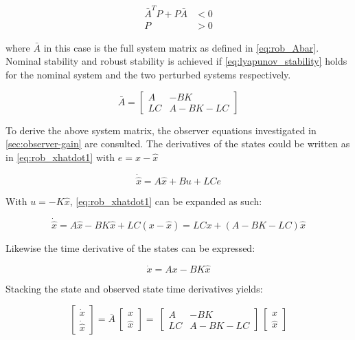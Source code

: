 \begin{equation} \label{eq:lyapunov_stability}
	\begin{split}
	\bar{A}^TP+P\bar{A} &< 0 \\
	P &> 0
	\end{split}
\end{equation}

\noindent where $\bar{A}$ in this case is the full system matrix as defined in \cref{eq:rob_Abar}. Nominal stability and robust stability is achieved if \cref{eq:lyapunov_stability} holds for the nominal system and the two perturbed systems respectively.

\begin{equation} \label{eq:rob_Abar}
	\bar{A} = \begin{bmatrix}
				A & -BK \\ LC & A-BK-LC
				\end{bmatrix}
\end{equation}

\noindent To derive the above system matrix, the observer equations investigated in \cref{sec:observer-gain} are consulted. The derivatives of the states could be written as in \cref{eq:rob_xhatdot1} with $e = x - \hat{x}$

\begin{equation} \label{eq:rob_xhatdot1}
	\dot{\hat{x}} = A\hat{x} + Bu + LCe
\end{equation}

\noindent With $u = -K\hat{x}$, \cref{eq:rob_xhatdot1} can be expanded as such:

\begin{equation} \label{eq:rob_xhatdot2}
	\dot{\hat{x}} = A\hat{x} - BK\hat{x} + LC(x - \hat{x}) =  LCx + (A - BK - LC)\hat{x}
\end{equation}

\noindent Likewise the time derivative of the states can be expressed:

\begin{equation} \label{eq:rob_xdot}
	\dot{x} = Ax - BK\hat{x}
\end{equation}

\noindent Stacking the state and observed state time derivatives yields:

\begin{equation}
	\begin{bmatrix}
		\dot{x} \\ \dot{\hat{x}}
	\end{bmatrix} = \bar{A}\
	\begin{bmatrix}
	x \\ \hat{x}
	\end{bmatrix} = \
	\begin{bmatrix}
		A & -BK \\ LC & A-BK-LC
	\end{bmatrix} \
	\begin{bmatrix}
		x \\ \hat{x}
	\end{bmatrix}
\end{equation}





